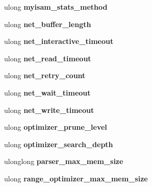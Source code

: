 \begin{DoxyCompactItemize}
ulong {\bfseries myisam\+\_\+stats\+\_\+method}
\item 
\mbox{\label{structsystem__variables_a33a53f6077ae61169e839e6438870c20}} 
ulong {\bfseries net\+\_\+buffer\+\_\+length}
\item 
\mbox{\label{structsystem__variables_a506e5ade79f6a68130bb45920c76b5f4}} 
ulong {\bfseries net\+\_\+interactive\+\_\+timeout}
\item 
\mbox{\label{structsystem__variables_a63b534a055f450fca901a08a49ae37cc}} 
ulong {\bfseries net\+\_\+read\+\_\+timeout}
\item 
\mbox{\label{structsystem__variables_a062f8571b371344f9ec65775320c669c}} 
ulong {\bfseries net\+\_\+retry\+\_\+count}
\item 
\mbox{\label{structsystem__variables_ad7e6fc819d4b174f61d55b7dd57a207c}} 
ulong {\bfseries net\+\_\+wait\+\_\+timeout}
\item 
\mbox{\label{structsystem__variables_acb6f3b214c4c9be823b284b28ed10228}} 
ulong {\bfseries net\+\_\+write\+\_\+timeout}
\item 
\mbox{\label{structsystem__variables_ab09350298640fe6efa029589edd06770}} 
ulong {\bfseries optimizer\+\_\+prune\+\_\+level}
\item 
\mbox{\label{structsystem__variables_a6b235f38c1000ee1b34d91ee0af7f161}} 
ulong {\bfseries optimizer\+\_\+search\+\_\+depth}
\item 
\mbox{\label{structsystem__variables_a2b48a808e061068da8819222b5f9e8a3}} 
ulonglong {\bfseries parser\+\_\+max\+\_\+mem\+\_\+size}
\item 
\mbox{\label{structsystem__variables_a2a58e359b7a707ef1c1cfae9826679a3}} 
ulong {\bfseries range\+\_\+optimizer\+\_\+max\+\_\+mem\+\_\+size}
\item 
\mbox{\label{structsystem__variables_a5461ba207b2c25479e808baa4241c0d5}} 

\end{DoxyCompactItemize}
